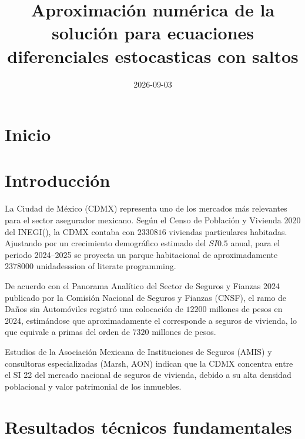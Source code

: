 \documentclass[
  spanish,
  us-letterpaper,
]{scrreprt}
\title{Aproximación numérica de la solución para ecuaciones
diferenciales estocasticas con saltos}
\author{}
\date{2026-09-03}
\renewcommand*\contentsname{Tabla de contenidos}
\newcommand\contentsname{Tabla de contenidos}
\theoremstyle{plain}
\theoremstyle{plain}
\theoremstyle{definition}
\theoremstyle{remark}
\begin{document}
\newtheorem{teorema}{Teorema}[chapter]
\newtheorem{definicion}{Definición}[chapter]
\newtheorem{lema}{Lema}[chapter]
\newtheorem{corolario}{Corolario}[chapter]
\newtheorem{proposicion}{Proposición}[chapter]
\renewcommand*\contentsname{Tabla de contenidos}
{
\setcounter{tocdepth}{2}
\tableofcontents
}


\chapter{Inicio}\label{inicio}


\chapter{Introducción}\label{introducciuxf3n}

La Ciudad de México (CDMX) representa uno de los mercados más relevantes
para el sector asegurador mexicano. Según el Censo de Población y
Vivienda 2020 del INEGI(\autocite{inegi2020censo}), la CDMX contaba con
\(2330816\) viviendas particulares habitadas. Ajustando por un
crecimiento demográfico estimado del \(SI{0.5}\) anual, para el periodo
2024--2025 se proyecta un parque habitacional de aproximadamente
\(2378000\) unidadesssion of literate programming.

De acuerdo con el Panorama Analítico del Sector de Seguros y Fianzas
2024 publicado por la Comisión Nacional de Seguros y Fianzas (CNSF), el
ramo de Daños sin Automóviles registró una colocación de \(12200\)
millones de pesos en 2024, estimándose que aproximadamente el
corresponde a seguros de vivienda, lo que equivale a primas del orden de
\(7320\) millones de pesos.

Estudios de la Asociación Mexicana de Instituciones de Seguros (AMIS) y
consultoras especializadas (Marsh, AON) indican que la CDMX concentra
entre el SI 22 del mercado nacional de seguros de vivienda, debido a su
alta densidad poblacional y valor patrimonial de los inmuebles.


\chapter{Resultados técnicos
fundamentales}\label{resultados-tuxe9cnicos-fundamentales}
\end{document}
